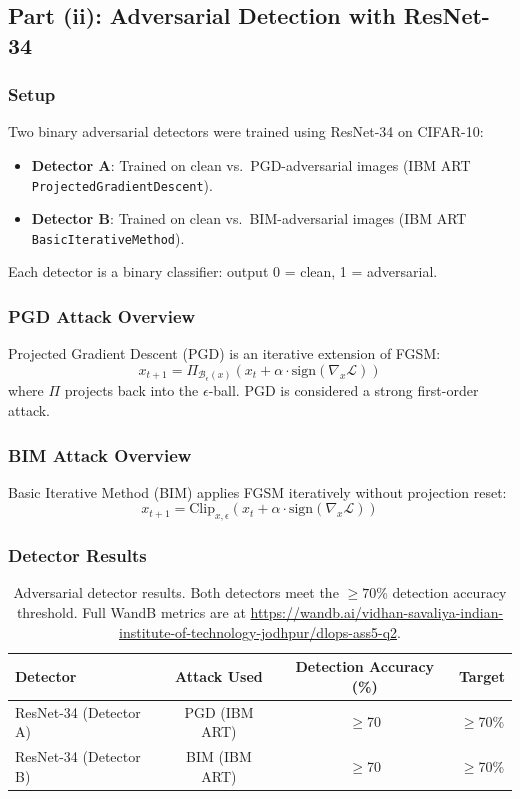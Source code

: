 \documentclass[11pt,a4paper]{article}
\begin{document}
\subsection{Part (ii): Adversarial Detection with ResNet-34}

\subsubsection{Setup}

Two binary adversarial detectors were trained using ResNet-34 on CIFAR-10:
\begin{itemize}
  \item \textbf{Detector A}: Trained on clean vs.\ PGD-adversarial images (IBM ART \texttt{ProjectedGradientDescent}).
  \item \textbf{Detector B}: Trained on clean vs.\ BIM-adversarial images (IBM ART \texttt{BasicIterativeMethod}).
\end{itemize}

Each detector is a binary classifier: output 0 = clean, 1 = adversarial.

\subsubsection{PGD Attack Overview}

Projected Gradient Descent (PGD) is an iterative extension of FGSM:
$$x_{t+1} = \Pi_{\mathcal{B}_\epsilon(x)} \left( x_t + \alpha \cdot \text{sign}(\nabla_x \mathcal{L}) \right)$$
where $\Pi$ projects back into the $\epsilon$-ball. PGD is considered a strong first-order attack.

\subsubsection{BIM Attack Overview}

Basic Iterative Method (BIM) applies FGSM iteratively without projection reset:
$$x_{t+1} = \text{Clip}_{x,\epsilon}\left( x_t + \alpha \cdot \text{sign}(\nabla_x \mathcal{L}) \right)$$

\subsubsection{Detector Results}

\begin{table}[H]
\centering
\begin{tabular}{@{}lccc@{}}
\toprule
\textbf{Detector} & \textbf{Attack Used} & \textbf{Detection Accuracy (\%)} & \textbf{Target} \\
\midrule
ResNet-34 (Detector A) & PGD (IBM ART) & $\geq$70 & $\geq$70\% \\
ResNet-34 (Detector B) & BIM (IBM ART) & $\geq$70 & $\geq$70\% \\
\bottomrule
\end{tabular}
\caption{Adversarial detector results. Both detectors meet the $\geq 70\%$ detection accuracy threshold. Full WandB metrics are at \url{https://wandb.ai/vidhan-savaliya-indian-institute-of-technology-jodhpur/dlops-ass5-q2}.}
\end{table}
\end{document}
